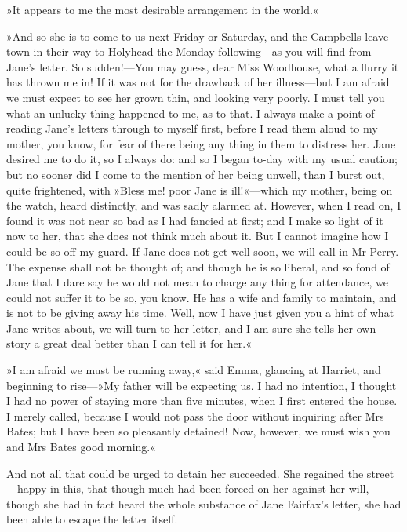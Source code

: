 »It appears to me the most desirable arrangement in the world.«

»And so she is to come to us next Friday or Saturday, and the Campbells leave town in their way to Holyhead the Monday following—as you will find from Jane's letter. So sudden!—You may guess, dear Miss Woodhouse, what a flurry it has thrown me in! If it was not for the drawback of her illness—but I am afraid we must expect to see her grown thin, and looking very poorly. I must tell you what an unlucky thing happened to me, as to that. I always make a point of reading Jane's letters through to myself first, before I read them aloud to my mother, you know, for fear of there being any thing in them to distress her. Jane desired me to do it, so I always do: and so I began to-day with my usual caution; but no sooner did I come to the mention of her being unwell, than I burst out, quite frightened, with »Bless me! poor Jane is ill!«—which my mother, being on the watch, heard distinctly, and was sadly alarmed at. However, when I read on, I found it was not near so bad as I had fancied at first; and I make so light of it now to her, that she does not think much about it. But I cannot imagine how I could be so off my guard. If Jane does not get well soon, we will call in Mr Perry. The expense shall not be thought of; and though he is so liberal, and so fond of Jane that I dare say he would not mean to charge any thing for attendance, we could not suffer it to be so, you know. He has a wife and family to maintain, and is not to be giving away his time. Well, now I have just given you a hint of what Jane writes about, we will turn to her letter, and I am sure she tells her own story a great deal better than I can tell it for her.«

»I am afraid we must be running away,« said Emma, glancing at Harriet, and beginning to rise—»My father will be expecting us. I had no intention, I thought I had no power of staying more than five minutes, when I first entered the house. I merely called, because I would not pass the door without inquiring after Mrs Bates; but I have been so pleasantly detained! Now, however, we must wish you and Mrs Bates good morning.«

And not all that could be urged to detain her succeeded. She regained the street—happy in this, that though much had been forced on her against her will, though she had in fact heard the whole substance of Jane Fairfax's letter, she had been able to escape the letter itself.